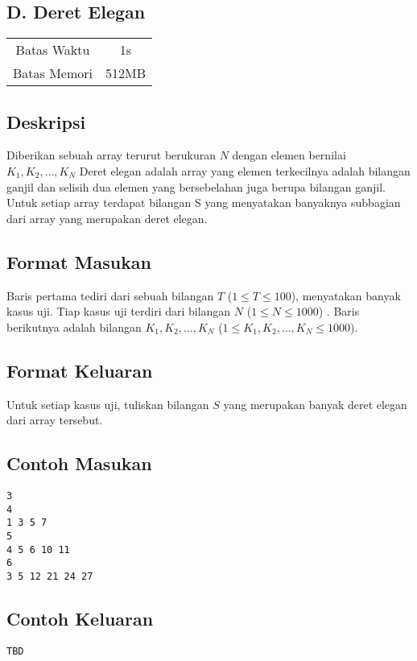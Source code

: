 \documentclass{article}
\begin{document}
\begin{center}
    \section*{D. Deret Elegan}

    \begin{tabular}{ | c c | }
        \hline
        Batas Waktu  & 1s \\
        Batas Memori & 512MB \\
        \hline
    \end{tabular}
\end{center}

\subsection*{Deskripsi}

Diberikan sebuah array terurut berukuran $N$ dengan elemen bernilai $K_1,K_2, \dots, K_N$
Deret elegan adalah array yang elemen terkecilnya adalah bilangan ganjil dan selisih dua elemen yang bersebelahan juga berupa bilangan ganjil.
Untuk setiap array terdapat bilangan S yang menyatakan banyaknya subbagian dari array yang merupakan deret elegan.

\subsection*{Format Masukan}

Baris pertama tediri dari sebuah bilangan $T$ ($1 \leq T \leq 100$), menyatakan banyak kasus uji.
Tiap kasus uji terdiri dari bilangan $N$ ($1 \leq N \leq 1000$) .
Baris berikutnya adalah bilangan $K_1,K_2,\dots,K_N$ ($1 \leq K_1,K_2,\dots,K_N \leq 1000$).

\subsection*{Format Keluaran}

Untuk setiap kasus uji, tuliskan bilangan $S$ yang merupakan banyak deret elegan dari array tersebut.

\begin{multicols}{2}
\subsection*{Contoh Masukan}
\begin{lstlisting}
3
4
1 3 5 7
5
4 5 6 10 11
6
3 5 12 21 24 27
\end{lstlisting}
\columnbreak
\subsection*{Contoh Keluaran}
\begin{lstlisting}
TBD
\end{lstlisting}
\vfill
\null
\end{multicols}

\pagebreak
\end{document}
